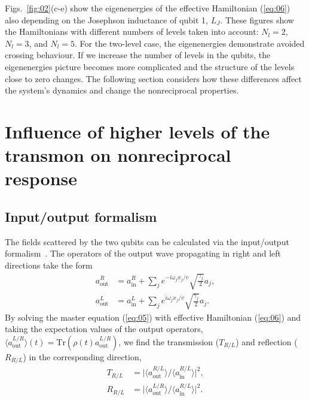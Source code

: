 \documentclass[lettersize,journal]{IEEEtran}
\begin{document}
Figs.~\ref{fig:02}(c-e) show the eigenenergies of the effective Hamiltonian (\ref{eq:06}) also depending on the Josephson inductance of qubit 1, $L_J$.
These figures show the Hamiltonians with different numbers of levels taken into account: $N_l = 2$, $N_l = 3$, and $N_l = 5$.
For the two-level case, the eigenenergies demonstrate avoided crossing behaviour.
If we increase the number of levels in the qubits, the eigenenergies picture becomes more complicated and the structure of the levels close to zero changes.
The following section considers how these differences affect the system's dynamics and change the nonreciprocal properties.

\section{Influence of higher levels of the transmon on nonreciprocal response}

\subsection{Input/output formalism}

The fields scattered by the two qubits can be calculated via the input/output formalism~\cite{gardiner2004quantum}.
The operators of the output wave propagating in right and left directions take the form
\begin{equation}\label{eq:16}
    \begin{aligned}
        a_\mathrm{out}^R &= a_\mathrm{in}^R  + \sum_j e^{-i \omega_j x_j / v} \sqrt{\frac{\gamma_{j}}{2}} a_j, \\
        a_\mathrm{out}^L &= a_\mathrm{in}^L  + \sum_j e^{i \omega_j x_j / v} \sqrt{\frac{\gamma_{j}}{2}} a_j.
    \end{aligned}
\end{equation}
By solving the master equation (\ref{eq:05}) with effective Hamiltonian (\ref{eq:06}) and taking the expectation values of the output operators, $\langle a_\mathrm{out}^{L / R} \rangle(t) = \mathrm{Tr}\left( \rho(t)  a_\mathrm{out}^{L / R} \right) $, we find the transmission ($T_{R/L}$) and reflection ($R_{R/L}$) in the corresponding direction,
\begin{equation}\label{eq:17}
    \begin{aligned}
       T_{R/L} &= \vert \langle a_\mathrm{out}^{R/L} \rangle / \langle a_\mathrm{in}^{R/L} \rangle \vert^2, \\
       R_{R/L} &= \vert \langle a_\mathrm{out}^{L/R} \rangle / \langle a_\mathrm{in}^{R/L} \rangle \vert^2.
    \end{aligned}
\end{equation}
\end{document}
